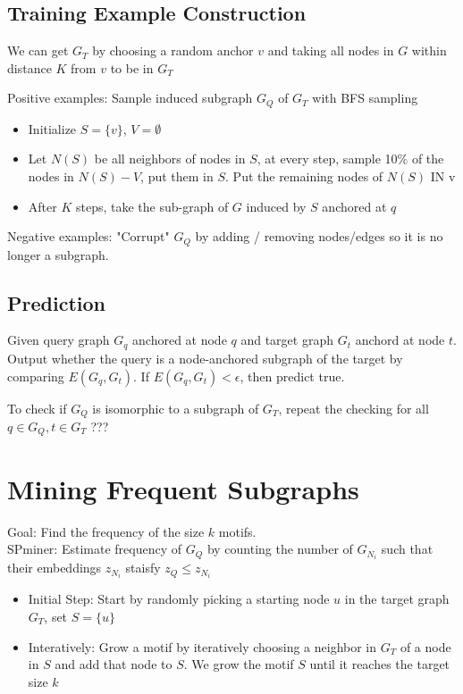 \subsection{Training Example Construction} 
We can get $G_T$ by choosing a random anchor $v$ and taking all nodes in $G$ within distance $K$ from $v$ to be in $G_T$ \\ \par

Positive examples: Sample induced subgraph $G_Q$ of $G_T$ with BFS sampling 
    \begin{itemize}
        \item Initialize $S = \{ v \} $, $V = \emptyset$
        \item Let $N(S)$ be all neighbors of nodes in $S$, at every step, sample 10\% of the nodes in $N(S) - V$, put them in $S$. Put the remaining nodes of $N(S)$ IN v
        \item After $K$ steps, take the sub-graph of $G$ induced by $S$ anchored at $q$
    \end{itemize}
Negative examples: "Corrupt" $G_Q$ by adding / removing nodes/edges so it is no longer a subgraph. 

\subsection{Prediction} 
Given query graph $G_q$ anchored at node $q$ and target graph $G_t$ anchord at node $t$. Output whether the query is a node-anchored subgraph of the target by comparing $E(G_q, G_t)$. If $E(G_q, G_t) < \epsilon$, then predict true. \\ \par

To check if $G_Q$ is isomorphic to a subgraph of $G_T$, repeat the checking for all $q\in G_Q, t\in G_T$
???


\section{Mining Frequent Subgraphs}
Goal: Find the frequency of the size $k$ motifs. \\
SPminer: Estimate frequency of $G_Q$ by counting the number of $G_{N_i}$ such that their embeddings $z_{N_i}$ staisfy $z_Q \leq z_{N_i}$
    \begin{itemize}
        \item Initial Step: Start by randomly picking a starting node $u$ in the target graph $G_T$, set $S = \{ u \}$
        \item Interatively: Grow a motif by iteratively choosing a neighbor in $G_T$ of a node in $S$ and add that node to $S$. We grow the motif $S$ until it reaches the target size $k$ 
    \end{itemize}